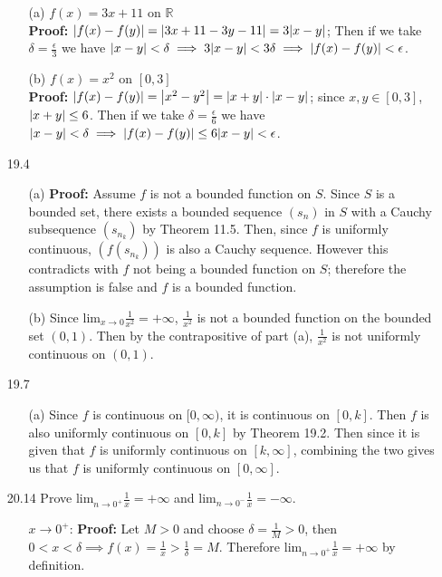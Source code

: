 \documentclass{article}
\begin{document}
\begin{itemize}
\begin{itemize}
              \item [(a)] $f(x)=3x+11$ on $\mathbb{R}$\\\textbf{Proof: }$\abs{f(x)-f(y)}=\abs{3x+11-3y-11}=3\abs{x-y}$; Then if we take $\delta=\frac{\epsilon}{3}$ we have $\abs{x-y}<\delta\implies 3\abs{x-y}<3\delta\implies\abs{f(x)-f(y)}<\epsilon$.
              \item [(b)] $f(x)=x^2$ on $[0,3]$\\\textbf{Proof: }$\abs{f(x)-f(y)}=\abs{x^2-y^2}=\abs{x+y}\cdot\abs{x-y}$; since $x,y\in[0,3]$, $\abs{x+y}\leq 6$. Then if we take $\delta=\frac{\epsilon}{6}$ we have $\abs{x-y}<\delta\implies \abs{f(x)-f(y)}\leq 6\abs{x-y}<\epsilon$.
          \end{itemize}
    \item [19.4]
          \begin{itemize}
              \item [(a)] \textbf{Proof:} Assume $f$ is not a bounded function on $S$. Since $S$ is a bounded set, there exists a bounded sequence $(s_n)$ in $S$ with a Cauchy subsequence $(s_{n_k})$ by Theorem 11.5. Then, since $f$ is uniformly continuous, $(f(s_{n_k}))$ is also a Cauchy sequence. However this contradicts with $f$ not being a bounded function on $S$; therefore the assumption is false and $f$ is a bounded function.
              \item [(b)] Since $\text{lim}_{x\rightarrow 0}\frac{1}{x^2}=+\infty$, $\frac{1}{x^2}$ is not a bounded function on the bounded set $(0,1)$. Then by the contrapositive of part (a), $\frac{1}{x^2}$ is not uniformly continuous on $(0,1)$.
          \end{itemize}
    \item [19.7]
          \begin{itemize}
              \item [(a)] Since $f$ is continuous on $[0,\infty)$, it is continuous on $[0,k]$. Then $f$ is also uniformly continuous on $[0,k]$ by Theorem 19.2. Then since it is given that $f$ is uniformly continuous on $[k,\infty]$, combining the two gives us that $f$ is uniformly continuous on $[0,\infty]$.
          \end{itemize}
    \item [20.14] Prove $\text{lim}_{n\rightarrow 0^+}\frac{1}{x}=+\infty$ and $\text{lim}_{n\rightarrow 0^-}\frac{1}{x}=-\infty$.
          \begin{itemize}
              \item [$x\rightarrow 0^+$: ] \textbf{Proof: } Let $M>0$ and choose $\delta=\frac{1}{M}>0$, then $0<x<\delta\implies f(x)=\frac{1}{x}>\frac{1}{\delta}=M$. Therefore $\text{lim}_{n\rightarrow 0^+}\frac{1}{x}=+\infty$ by definition.

\end{itemize}
\end{itemize}
\end{document}
